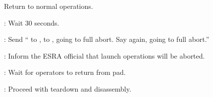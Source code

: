 \begin{checklist}
\begin{checklist}
\begin{checklist}
\begin{checklist}[label=$\bullet$]
\begin{checklist}
                \item Return to normal operations.
            \end{checklist}
        \end{checklist}
    \end{checklist}
    \item \ops: Wait 30 seconds.
    \item \ops: Send ``\ops{} to \secondary{}, \ops{} to \secondary{}, going to full abort. Say again, going to full abort.''
    \item \ops: Inform the ESRA official that launch operations will be aborted.
    \item \ops: Wait for operators to return from pad.
    \item \ops: Proceed with teardown and disassembly.
\end{checklist}

\newpage


\end{checklist}
